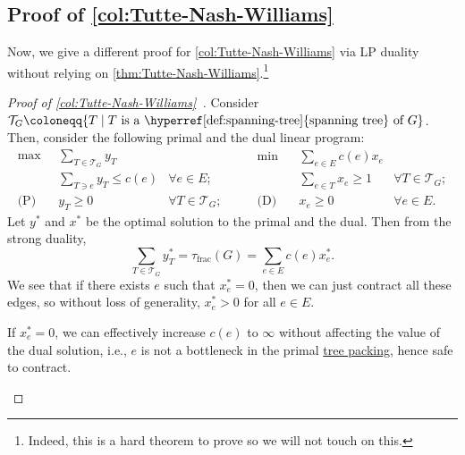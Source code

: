 \subsection{Proof of \autoref{col:Tutte-Nash-Williams}}
Now, we give a different proof for \autoref{col:Tutte-Nash-Williams} via LP duality without relying on \autoref{thm:Tutte-Nash-Williams}.\footnote{Indeed, this is a hard theorem to prove so we will not touch on this.}

\begin{proof}[Proof of \autoref{col:Tutte-Nash-Williams}~\cite{chekuri2017near}]\label{pf:col:Tutte-Nash-Williams}
	Consider \(\mathcal{T} _G \coloneqq \{ T \mid T \text{ is a \hyperref[def:spanning-tree]{spanning tree} of } G \} \). Then, consider the following primal and the dual linear program:
	\[
		\begin{aligned}
			\max~           & \sum_{T \in \mathcal{T} _G} y_T                                 \\
			                & \sum_{T \ni e} y_T \leq c(e)    & \forall e \in E;              \\
			\text{(P)}\quad & y_T \geq 0                      & \forall T \in \mathcal{T} _G;
		\end{aligned}\qquad
		\begin{aligned}
			\min~           & \sum_{e \in E} c(e) x_e                                   \\
			                & \sum_{e \in T} x_e \geq 1 & \forall T \in \mathcal{T} _G; \\
			\text{(D)}\quad & x_e \geq 0                & \forall e \in E.
		\end{aligned}
	\]
	Let \(y^{\ast} \) and \(x^{\ast} \) be the optimal solution to the primal and the dual. Then from the strong duality,
	\[
		\sum_{T \in \mathcal{T} _G} y^{\ast} _T
		= \tau _{\text{frac} }(G)
		= \sum_{e \in E} c(e) x^{\ast} _e.
	\]
	We see that if there exists \(e\) such that \(x^{\ast} _e = 0\), then we can just contract all these edges, so without loss of generality, \(x^{\ast} _e > 0\) for all \(e \in E\).

	\begin{intuition}
		If \(x^{\ast} _e = 0\), we can effectively increase \(c(e)\) to \(\infty \) without affecting the value of the dual solution, i.e., \(e\) is not a bottleneck in the primal \hyperref[prb:TP]{tree packing}, hence safe to contract.
	\end{intuition}


\end{proof}

